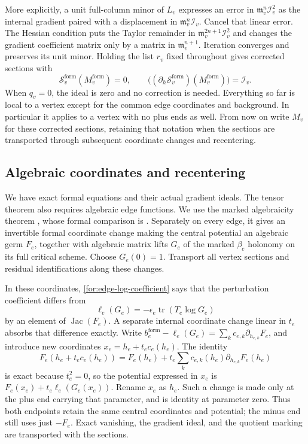 More explicitly, a unit full-column minor of $L_v$ expresses an error
in $\mathfrak m_v^n\mathcal I_v^2$ as the internal gradient paired
with a displacement in $\mathfrak m_v^n\mathcal I_v$.  Cancel that
linear error.  The Hessian condition puts the Taylor remainder in
$\mathfrak m_v^{2n+1}\mathcal I_v^2$ and changes the gradient
coefficient matrix only by a matrix in
$\mathfrak m_v^{n+1}$.  Iteration converges and preserves its unit
minor.  Holding the list $r_v$ fixed throughout gives corrected
sections with
\begin{equation}
\label{for:exact-before-algebraic}
 \mathcal S_v^{\mathrm{form}}(M_v^{\mathrm{form}})=0,
 \qquad
 \bigl((\partial_h\mathcal S_v^{\mathrm{form}})
                  (M_v^{\mathrm{form}})\bigr)=\mathcal I_v.
\end{equation}
When $q_v=0$, the ideal is zero and no correction is needed.
Everything so far is local to a vertex except for the common edge
coordinates and background.  In particular it applies to a vertex
with no plus ends as well.
From now on write $M_v$ for these corrected sections, retaining that
notation when the sections are transported through subsequent
coordinate changes and recentering.

\subsection{Algebraic coordinates and recentering}

We have exact formal equations and their actual gradient ideals.  The
tensor theorem also requires algebraic edge functions.  We use the
marked algebraicity theorem \cite[Theorem~5.1]{MT}, whose formal
comparison is \cite[Proposition~5.2]{MT}.  Separately on every edge,
it gives an invertible formal coordinate change making the central
potential an algebraic germ $F_e$, together with algebraic matrix
lifts $G_e$ of the marked $\beta_e$ holonomy on its full critical
scheme.  Choose $G_e(0)=1$.  Transport all vertex sections and residual
identifications along these changes.

In these coordinates, \eqref{for:edge-log-coefficient} says that the
perturbation coefficient differs from
\[
 \ell_e(G_e)=-\epsilon_e\operatorname{tr}(T_e\log G_e)
\]
by an element of $\operatorname{Jac}(F_e)$.  A separate internal
coordinate change linear in $t_e$ absorbs that difference exactly.
Write $b_e^{\mathrm{form}}-\ell_e(G_e)
=\sum_k c_{e,k}\partial_{h_{e,k}}F_e$, and introduce new coordinates
$x_e=h_e+t_ec_e(h_e)$.  The identity
\[
 F_e(h_e+t_ec_e(h_e))
 =F_e(h_e)+t_e\sum_kc_{e,k}(h_e)\partial_{h_{e,k}}F_e(h_e)
\]
is exact because $t_e^2=0$, so the potential expressed in $x_e$ is
$F_e(x_e)+t_e\ell_e(G_e(x_e))$.  Rename $x_e$ as $h_e$.
Such a change is made only at the plus
end carrying that parameter, and is identity at parameter zero.
Thus both endpoints retain the same central coordinates and potential;
the minus end still uses just $-F_e$.  Exact vanishing, the gradient
ideal, and the quotient marking are transported with the sections.

